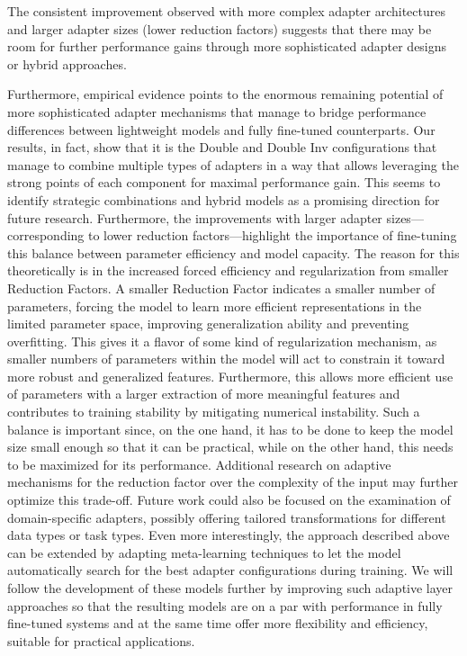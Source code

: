 \documentclass[conference]{IEEEtran}
\begin{document}
The consistent improvement observed with more complex adapter architectures and larger adapter sizes (lower reduction factors) suggests that there may be room for further performance gains through more sophisticated adapter designs or hybrid approaches.

Furthermore, empirical evidence points to the enormous remaining potential of more sophisticated adapter mechanisms that manage to bridge performance differences between lightweight models and fully fine-tuned counterparts. Our results, in fact, show that it is the Double and Double Inv configurations that manage to combine multiple types of adapters in a way that allows leveraging the strong points of each component for maximal performance gain. This seems to identify strategic combinations and hybrid models as a promising direction for future research. Furthermore, the improvements with larger adapter sizes—corresponding to lower reduction factors—highlight the importance of fine-tuning this balance between parameter efficiency and model capacity. The reason for this theoretically is in the increased forced efficiency and regularization from smaller Reduction Factors. A smaller Reduction Factor indicates a smaller number of parameters, forcing the model to learn more efficient representations in the limited parameter space, improving generalization ability and preventing overfitting. This gives it a flavor of some kind of regularization mechanism, as smaller numbers of parameters within the model will act to constrain it toward more robust and generalized features. Furthermore, this allows more efficient use of parameters with a larger extraction of more meaningful features and contributes to training stability by mitigating numerical instability. Such a balance is important since, on the one hand, it has to be done to keep the model size small enough so that it can be practical, while on the other hand, this needs to be maximized for its performance. Additional research on adaptive mechanisms for the reduction factor over the complexity of the input may further optimize this trade-off. Future work could also be focused on the examination of domain-specific adapters, possibly offering tailored transformations for different data types or task types. Even more interestingly, the approach described above can be extended by adapting meta-learning techniques to let the model automatically search for the best adapter configurations during training. We will follow the development of these models further by improving such adaptive layer approaches so that the resulting models are on a par with performance in fully fine-tuned systems and at the same time offer more flexibility and efficiency, suitable for practical applications.
\end{document}
